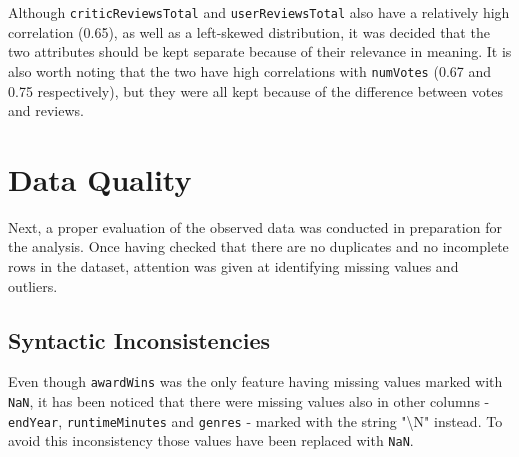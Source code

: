 Although \texttt{criticReviewsTotal} and \texttt{userReviewsTotal} also have a relatively high correlation (0.65), as well as a left-skewed distribution, it was decided that the two attributes should be kept separate because of their relevance in meaning. It is also worth noting that the two have high correlations with \texttt{numVotes} (0.67 and 0.75 respectively), but they were all kept because of the difference between votes and reviews.



\section{Data Quality}\label{sec:data_quality}
Next, a proper evaluation of the observed data was conducted in preparation for the analysis.
Once having checked that there are no duplicates and no incomplete rows in the dataset,
attention was given at identifying missing values and outliers.

\subsection{Syntactic Inconsistencies} 
Even though \texttt{awardWins} was the only feature having missing values marked with \texttt{NaN}, 
it has been noticed that there were missing values also in other columns - \texttt{endYear}, \texttt{runtimeMinutes} and \texttt{genres} -
marked with the string "\textbackslash N" instead.
To avoid this inconsistency those values have been replaced with \texttt{NaN}.


